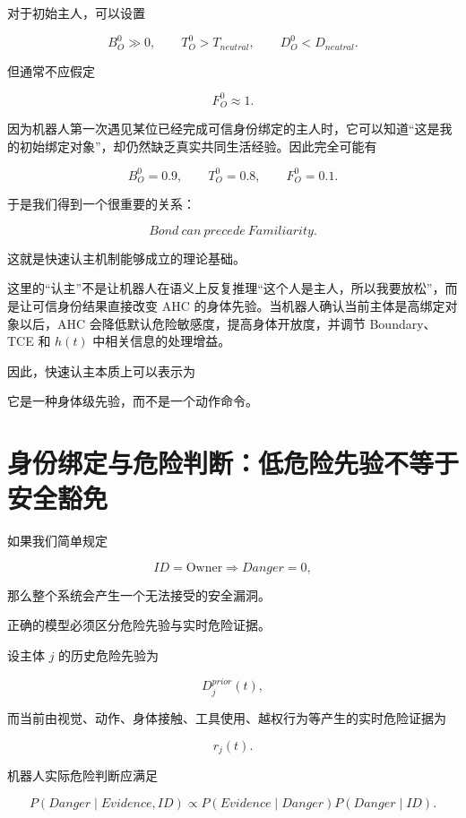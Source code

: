 对于初始主人，可以设置

\[
B_O^0\gg 0,
\qquad
T_O^0>T_{neutral},
\qquad
D_O^0<D_{neutral}.
\]

但通常不应假定

\[
F_O^0\approx 1.
\]

因为机器人第一次遇见某位已经完成可信身份绑定的主人时，它可以知道“这是我的初始绑定对象”，却仍然缺乏真实共同生活经验。因此完全可能有

\[
B_O^0=0.9,
\qquad
T_O^0=0.8,
\qquad
F_O^0=0.1.
\]

于是我们得到一个很重要的关系：

\[
\boxed{
Bond\ can\ precede\ Familiarity.
}
\]

这就是快速认主机制能够成立的理论基础。

这里的“认主”不是让机器人在语义上反复推理“这个人是主人，所以我要放松”，而是让可信身份结果直接改变 AHC 的身体先验。当机器人确认当前主体是高绑定对象以后，AHC 会降低默认危险敏感度，提高身体开放度，并调节 Boundary、TCE 和 $h(t)$ 中相关信息的处理增益。

因此，快速认主本质上可以表示为

\begin{statementbox}
\centering
{}
\end{statementbox}

它是一种身体级先验，而不是一个动作命令。


\section{身份绑定与危险判断：低危险先验不等于安全豁免}

如果我们简单规定

\[
ID=\mathrm{Owner}
\Rightarrow
Danger=0,
\]

那么整个系统会产生一个无法接受的安全漏洞。

正确的模型必须区分危险先验与实时危险证据。

设主体 $j$ 的历史危险先验为

\[
D_j^{prior}(t),
\]

而当前由视觉、动作、身体接触、工具使用、越权行为等产生的实时危险证据为

\[
r_j(t).
\]

机器人实际危险判断应满足

\[
P(Danger\mid Evidence,ID)
\propto
P(Evidence\mid Danger)
P(Danger\mid ID).
\]

